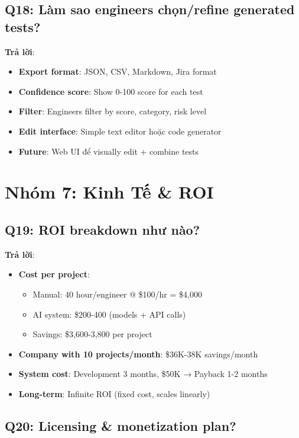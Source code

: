 \documentclass[12pt,a4paper]{report}
\begin{document}
\subsection{Q18: Làm sao engineers chọn/refine generated tests?}

\textbf{Trả lời}:
\begin{itemize}
    \item \textbf{Export format}: JSON, CSV, Markdown, Jira format
    \item \textbf{Confidence score}: Show 0-100 score for each test
    \item \textbf{Filter}: Engineers filter by score, category, risk level
    \item \textbf{Edit interface}: Simple text editor hoặc code generator
    \item \textbf{Future}: Web UI để visually edit + combine tests
\end{itemize}

\section{Nhóm 7: Kinh Tế & ROI}

\subsection{Q19: ROI breakdown như nào?}

\textbf{Trả lời}:
\begin{itemize}
    \item \textbf{Cost per project}: 
    \begin{itemize}
        \item Manual: 40 hour/engineer @ \$100/hr = \$4,000
        \item AI system: \$200-400 (models + API calls)
        \item Savings: \$3,600-3,800 per project
    \end{itemize}
    \item \textbf{Company with 10 projects/month}: \$36K-38K savings/month
    \item \textbf{System cost}: Development 3 months, \$50K → Payback 1-2 months
    \item \textbf{Long-term}: Infinite ROI (fixed cost, scales linearly)
\end{itemize}

\subsection{Q20: Licensing & monetization plan?}
\end{document}
